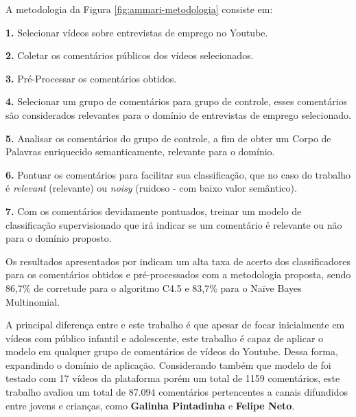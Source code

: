 A metodologia da Figura \ref{fig:ammari-metodologia} consiste em:

\textbf{1.} Selecionar vídeos sobre entrevistas de emprego no Youtube.

\textbf{2.} Coletar os comentários públicos dos vídeos selecionados.

\textbf{3.} Pré-Processar os comentários obtidos.

\textbf{4.} Selecionar um grupo de comentários para grupo de controle, esses comentários são considerados relevantes para o domínio de entrevistas de emprego selecionado.

\textbf{5.} Analisar os comentários do grupo de controle, a fim de obter um Corpo de Palavras enriquecido semanticamente, relevante para o domínio.

\textbf{6.} Pontuar os comentários para facilitar sua classificação, que no caso do trabalho \cite{ammari2011filteringYt} é \textit{relevant} (relevante) ou \textit{noisy} (ruidoso - com baixo valor semântico).

\textbf{7.} Com os comentários devidamente pontuados, treinar um modelo de classificação supervisionado que irá indicar se um comentário é relevante ou não para o domínio proposto.

Os resultados apresentados por \cite{ammari2011filteringYt} indicam um alta taxa de acerto dos classificadores para os comentários obtidos e pré-processados com a metodologia proposta, sendo 86,7\% de corretude para o algoritmo C4.5 e 83,7\% para o Naïve Bayes Multinomial.

A principal diferença entre \cite{ammari2011filteringYt} e este trabalho é que apesar de focar inicialmente em vídeos com público infantil e adolescente, este trabalho é capaz de aplicar o modelo em qualquer grupo de comentários de vídeos do Youtube. Dessa forma, expandindo o domínio de aplicação. Considerando também que modelo de \cite{ammari2011filteringYt} foi testado com 17 vídeos da plataforma porém um total de 1159 comentários, este trabalho avaliou um total de 87.094 comentários pertencentes a canais difundidos entre jovens e crianças, como \textbf{Galinha Pintadinha} e \textbf{Felipe Neto}.


